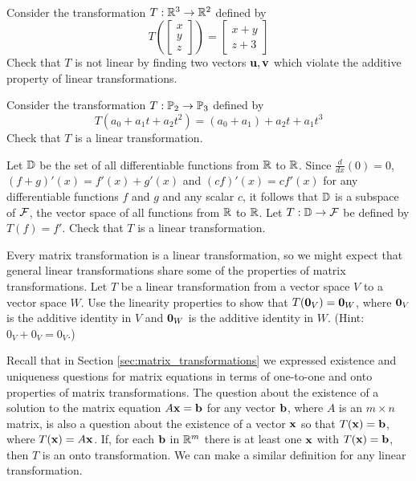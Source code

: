 \begin{pa} \label{pa:8_a} ~
	\be
	\item Consider the transformation $T: \mathbb{R}^3 \to \mathbb{R}^2$ defined by 
	\[T\left( \left[ \begin{array}{cc} x\\y\\z \end{array} \right] \right) = \left[ \begin{array}{c} x+y\\z+3 \end{array} \right]\]
Check that $T$ is not linear by finding two vectors $\mathbf{u}, \mathbf{v}$ which violate the additive property of linear transformations.
	
		\item  Consider the transformation $T : \mathbb{P}_2 \to \mathbb{P}_3$ defined by
	\[T(a_0+a_1t+a_2t^2) = (a_0+a_1) + a_2t + a_1t^3\]
Check that $T$ is a linear transformation.

	\item Let $\mathbb{D}$ be the set of all differentiable functions from $\mathbb{R}$ to $\mathbb{R}$. Since $\frac{d}{dx}(0) = 0$, $(f+g)'(x) = f'(x)+g'(x)$ and $(cf)'(x) = cf'(x)$ for any differentiable functions $f$ and $g$ and any scalar $c$, it follows that $\mathbb{D}$ is a subspace of $\mathcal{F}$, the vector space of all functions from $\mathbb{R}$ to $\mathbb{R}$. Let $T: \mathbb{D} \to \mathcal{F}$ be defined by $T(f) = f'$. Check that $T$ is a linear transformation.
		
	\item Every matrix transformation is a linear transformation, so we might expect that general linear transformations share some of the properties of matrix transformations. Let $T$ be a linear transformation from a vector space $V$ to a vector space $W$. Use the linearity properties to show that $T(\mathbf{0}_V) = \mathbf{0}_W$,  where $\mathbf{0}_V$ is the additive identity in $V$ and $\mathbf{0}_W$ is the additive identity in $W$. (Hint: $0_V + 0_V = 0_V$.)


\ee

\end{pa}

\label{sec:onto_oneone}

Recall that in Section \ref{sec:matrix_transformations} we expressed existence and uniqueness questions for matrix equations in terms of one-to-one and onto properties of matrix transformations. The question about the existence of a solution to the matrix equation $A \mathbf{x} = \mathbf{b}$ for any vector $\mathbf{b}$, where $A$ is an $m \times n$ matrix, is also a question about the existence of a vector $\mathbf{x}$ so that $T(\mathbf{x}) = \mathbf{b}$, where $T(\mathbf{x}) = A \mathbf{x}$. If, for each $\mathbf{b}$ in $\mathbb{R}^m$ there is at least one $\mathbf{x}$ with $T(\mathbf{x}) = \mathbf{b}$, then $T$ is an onto transformation. We can make a similar definition for any linear transformation. 

